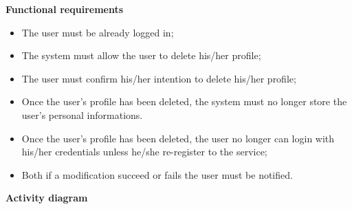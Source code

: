 \documentclass{article}
\begin{document}
	\bigskip
	\noindent
	\textbf{Functional requirements} \\
	\begin{itemize}
		\item The user must be already logged in;
		\item The system must allow the user to delete his/her profile;
		\item The user must confirm his/her intention to delete his/her profile;
		\item Once the user's profile has been deleted, the system must no longer store the user's personal informations.
		\item Once the user's profile has been deleted, the user no longer can login with his/her credentials unless he/she re-register to the service;
		\item Both if a modification succeed or fails the user must be notified.
	\end{itemize}
	
	\newpage
	\noindent
	\textbf{Activity diagram} \\
	
\end{document}
